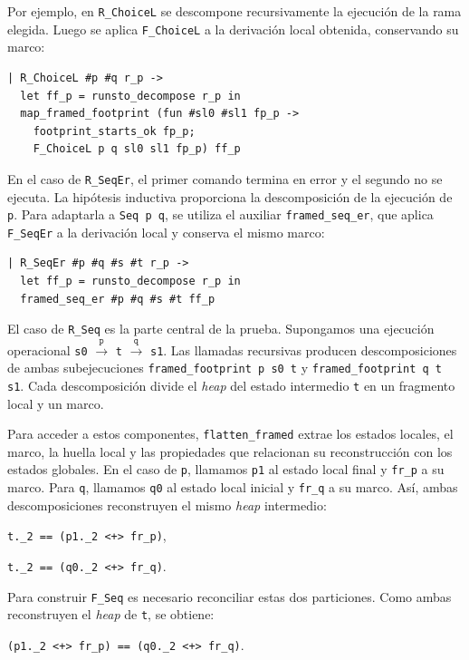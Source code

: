 \documentclass[a4paper,	11pt]{report}
\begin{document}
Por ejemplo,
en \lstinline|R_ChoiceL| se descompone recursivamente la ejecución de la rama elegida.
Luego se aplica \lstinline|F_ChoiceL| a la derivación local obtenida,
conservando su marco:

\begin{lstlisting}
| R_ChoiceL #p #q r_p ->
  let ff_p = runsto_decompose r_p in
  map_framed_footprint (fun #sl0 #sl1 fp_p ->
    footprint_starts_ok fp_p;
    F_ChoiceL p q sl0 sl1 fp_p) ff_p
\end{lstlisting}

En el caso de \lstinline|R_SeqEr|,
el primer comando termina en error y el segundo no se ejecuta.
La hipótesis inductiva proporciona la descomposición de la ejecución de \lstinline|p|.
Para adaptarla a \lstinline|Seq p q|,
se utiliza el auxiliar \lstinline|framed_seq_er|,
que aplica \lstinline|F_SeqEr| a la derivación local y conserva el mismo marco:

\begin{lstlisting}
| R_SeqEr #p #q #s #t r_p ->
  let ff_p = runsto_decompose r_p in
  framed_seq_er #p #q #s #t ff_p
\end{lstlisting}

El caso de \lstinline|R_Seq| es la parte central de la prueba.
Supongamos una ejecución operacional \lstinline|s0| $\xrightarrow{\texttt{p}}$ \lstinline|t| $\xrightarrow{\texttt{q}}$ \lstinline|s1|.
Las llamadas recursivas producen descomposiciones de ambas subejecuciones \lstinline|framed_footprint p s0 t| y \lstinline|framed_footprint q t s1|.
Cada descomposición divide el \emph{heap} del estado intermedio \lstinline|t| en un fragmento local y un marco.

Para acceder a estos componentes,
\lstinline|flatten_framed| extrae los estados locales,
el marco,
la huella local y las propiedades que relacionan su reconstrucción con los estados globales.
En el caso de \lstinline|p|,
llamamos \lstinline|p1| al estado local final y \lstinline|fr_p| a su marco.
Para \lstinline|q|,
llamamos \lstinline|q0| al estado local inicial y \lstinline|fr_q| a su marco.
Así,
ambas descomposiciones reconstruyen el mismo \emph{heap} intermedio:

\begin{center}
\lstinline|t._2 == (p1._2 <+> fr_p)|,

\lstinline|t._2 == (q0._2 <+> fr_q)|.
\end{center}

Para construir \lstinline|F_Seq| es necesario reconciliar estas dos particiones.
Como ambas reconstruyen el \emph{heap} de \lstinline|t|,
se obtiene:
\begin{center}
\lstinline|(p1._2 <+> fr_p) == (q0._2 <+> fr_q)|.
\end{center}
\end{document}

